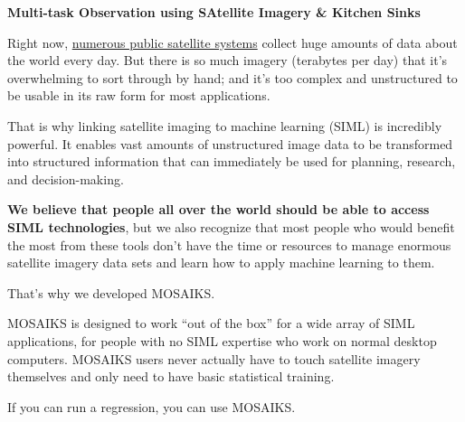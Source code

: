\documentclass[
  letterpaper,
  DIV=11,
  numbers=noendperiod]{scrreprt}
\begin{document}
\begin{tcolorbox}[enhanced jigsaw, opacityback=0, left=2mm, leftrule=.75mm, colback=white, opacitybacktitle=0.6, colbacktitle=quarto-callout-tip-color!10!white, toprule=.15mm, arc=.35mm, toptitle=1mm, colframe=quarto-callout-tip-color-frame, bottomrule=.15mm, coltitle=black, bottomtitle=1mm, rightrule=.15mm, titlerule=0mm, title=\textcolor{quarto-callout-tip-color}{\faLightbulb}\hspace{0.5em}{MOSAIKS}, breakable]

\textbf{Multi-task Observation using SAtellite Imagery \& Kitchen Sinks}

\end{tcolorbox}

Right now,
\href{https://www.ucsusa.org/resources/satellite-database\#.VF_jIlPF8Wg}{numerous
public satellite systems} collect huge amounts of data about the world
every day. But there is so much imagery (terabytes per day) that it's
overwhelming to sort through by hand; and it's too complex and
unstructured to be usable in its raw form for most applications.

That is why linking satellite imaging to machine learning (SIML) is
incredibly powerful. It enables vast amounts of unstructured image data
to be transformed into structured information that can immediately be
used for planning, research, and decision-making.

\textbf{We believe that people all over the world should be able to
access SIML technologies}, but we also recognize that most people who
would benefit the most from these tools don't have the time or resources
to manage enormous satellite imagery data sets and learn how to apply
machine learning to them.

That's why we developed MOSAIKS.

MOSAIKS is designed to work ``out of the box'' for a wide array of SIML
applications, for people with no SIML expertise who work on normal
desktop computers. MOSAIKS users never actually have to touch satellite
imagery themselves and only need to have basic statistical training.

\begin{tcolorbox}[enhanced jigsaw, opacityback=0, arc=.35mm, left=2mm, leftrule=.75mm, colback=white, rightrule=.15mm, bottomrule=.15mm, toprule=.15mm, breakable]

If you can run a regression, you can use MOSAIKS.

\end{tcolorbox}
\end{document}

